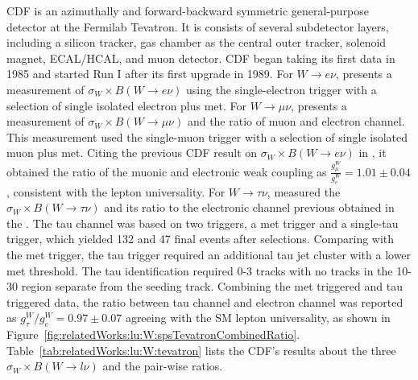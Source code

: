 CDF is an azimuthally and forward-backward symmetric general-purpose detector at the Fermilab Tevatron. It is consists of several subdetector layers, including a silicon tracker, gas chamber as the central outer tracker, solenoid magnet, ECAL/HCAL, and muon detector. CDF began taking its first data in 1985 and started Run I after its first upgrade in 1989. For $W \to e  \nu$, \cite{Abe:1990sd} presents a measurement of $\sigma_W \times B(W\to e \nu)$ using the single-electron trigger with a selection of single isolated electron plus met. For $W \to \mu  \nu$, \cite{Abe:1992ys} presents a measurement of $\sigma_W \times B(W\to \mu \nu)$ and the ratio of muon and electron channel. This measurement used the single-muon trigger with a selection of single isolated muon plus met. Citing the previous CDF result on $\sigma_W \times B(W\to e \nu)$ in \cite{Abe:1990sd}, it obtained the ratio of the muonic and electronic weak coupling as $\frac{g^W_\mu}{g^W_e}=1.01\pm0.04$, consistent with the lepton universality. For $W \to \tau \nu$, \cite{Abe:1991fb} measured the $\sigma_W \times B(W\to \tau \nu)$ and its ratio to the electronic channel previous obtained in the \cite{Abe:1990sd}. The tau channel was based on two triggers, a met trigger and a single-tau trigger, which yielded 132 and 47 final events after selections. Comparing with the met trigger, the tau trigger required an additional tau jet cluster with a lower met threshold. The tau identification required 0-3 tracks with no tracks in the 10\degree - 30 \degree region separate from the seeding track. Combining the met triggered and tau triggered data, the ratio between tau channel and electron channel was reported as $g^W_\tau/g^W_e=0.97\pm0.07$  agreeing with the SM lepton universality, as shown in Figure~\ref{fig:relatedWorks:lu:W:spsTevatronCombinedRatio}. Table~\ref{tab:relatedWorks:lu:W:tevatron} lists the CDF's results about the three $\sigma_W \times B(W\to l \nu)$ and the pair-wise ratios.





